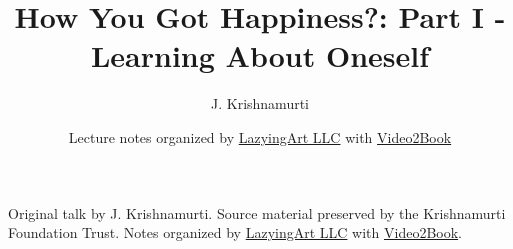 \documentclass[11pt,oneside]{book}
\begin{document}
\frontmatter
\title{How You Got Happiness?: Part I - Learning About Oneself}
\author{J. Krishnamurti}
\date{Lecture notes organized by \href{https://lazying.art}{LazyingArt LLC} with \href{https://github.com/lachlanchen/Video2Book}{Video2Book}}
\maketitle
\begin{center}
\small Original talk by J. Krishnamurti. Source material preserved by the Krishnamurti Foundation Trust. Notes organized by \href{https://lazying.art}{LazyingArt LLC} with \href{https://github.com/lachlanchen/Video2Book}{Video2Book}.
\end{center}
\clearpage
\mainmatter

\end{document}
